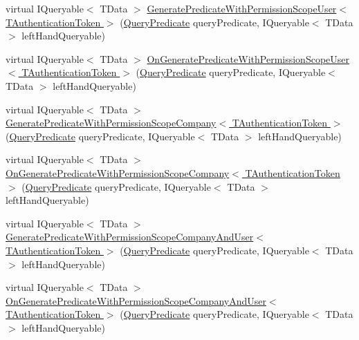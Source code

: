 \begin{DoxyCompactItemize}
\item 
virtual I\+Queryable$<$ T\+Data $>$ \hyperlink{classCqrs_1_1Repositories_1_1Queries_1_1QueryBuilder_a027cb88563991a842002c219d7589426_a027cb88563991a842002c219d7589426}{Generate\+Predicate\+With\+Permission\+Scope\+User$<$ T\+Authentication\+Token $>$} (\hyperlink{classCqrs_1_1Repositories_1_1Queries_1_1QueryPredicate}{Query\+Predicate} query\+Predicate, I\+Queryable$<$ T\+Data $>$ left\+Hand\+Queryable)
\item 
virtual I\+Queryable$<$ T\+Data $>$ \hyperlink{classCqrs_1_1Repositories_1_1Queries_1_1QueryBuilder_a314592206fd5d2a25866227cc547dd6b_a314592206fd5d2a25866227cc547dd6b}{On\+Generate\+Predicate\+With\+Permission\+Scope\+User$<$ T\+Authentication\+Token $>$} (\hyperlink{classCqrs_1_1Repositories_1_1Queries_1_1QueryPredicate}{Query\+Predicate} query\+Predicate, I\+Queryable$<$ T\+Data $>$ left\+Hand\+Queryable)
\item 
virtual I\+Queryable$<$ T\+Data $>$ \hyperlink{classCqrs_1_1Repositories_1_1Queries_1_1QueryBuilder_aa1341909b87629158efa619af12cec5f_aa1341909b87629158efa619af12cec5f}{Generate\+Predicate\+With\+Permission\+Scope\+Company$<$ T\+Authentication\+Token $>$} (\hyperlink{classCqrs_1_1Repositories_1_1Queries_1_1QueryPredicate}{Query\+Predicate} query\+Predicate, I\+Queryable$<$ T\+Data $>$ left\+Hand\+Queryable)
\item 
virtual I\+Queryable$<$ T\+Data $>$ \hyperlink{classCqrs_1_1Repositories_1_1Queries_1_1QueryBuilder_a1f036fd121ef5181f846e6da72dddbad_a1f036fd121ef5181f846e6da72dddbad}{On\+Generate\+Predicate\+With\+Permission\+Scope\+Company$<$ T\+Authentication\+Token $>$} (\hyperlink{classCqrs_1_1Repositories_1_1Queries_1_1QueryPredicate}{Query\+Predicate} query\+Predicate, I\+Queryable$<$ T\+Data $>$ left\+Hand\+Queryable)
\item 
virtual I\+Queryable$<$ T\+Data $>$ \hyperlink{classCqrs_1_1Repositories_1_1Queries_1_1QueryBuilder_a49c0626c4137be11afbb1e398294e474_a49c0626c4137be11afbb1e398294e474}{Generate\+Predicate\+With\+Permission\+Scope\+Company\+And\+User$<$ T\+Authentication\+Token $>$} (\hyperlink{classCqrs_1_1Repositories_1_1Queries_1_1QueryPredicate}{Query\+Predicate} query\+Predicate, I\+Queryable$<$ T\+Data $>$ left\+Hand\+Queryable)
\item 
virtual I\+Queryable$<$ T\+Data $>$ \hyperlink{classCqrs_1_1Repositories_1_1Queries_1_1QueryBuilder_aded996242ae739440270f227ad777635_aded996242ae739440270f227ad777635}{On\+Generate\+Predicate\+With\+Permission\+Scope\+Company\+And\+User$<$ T\+Authentication\+Token $>$} (\hyperlink{classCqrs_1_1Repositories_1_1Queries_1_1QueryPredicate}{Query\+Predicate} query\+Predicate, I\+Queryable$<$ T\+Data $>$ left\+Hand\+Queryable)

\end{DoxyCompactItemize}
